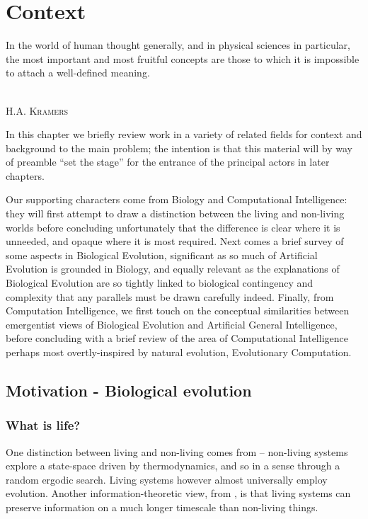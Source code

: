 \chapter{Context}\label{context}

\epigraph{%
In the world of human thought generally, and in physical sciences in particular, the most important and most fruitful concepts are those to which it is impossible to attach a well-defined meaning.}%
{\textsc{\\H.A. Kramers}}

In this chapter we briefly review work in a variety of related fields for context and background to the main problem; the intention is that this material will by way of preamble ``set the stage'' for the entrance of the principal actors in later chapters.

Our supporting characters come from Biology and Computational Intelligence: they will first attempt to draw a distinction between the living and non-living worlds before concluding unfortunately that the difference is clear where it is unneeded, and opaque where it is most required. Next comes a brief survey of some aspects in Biological Evolution, significant as so much of Artificial Evolution is grounded in Biology, and equally relevant as the explanations of Biological Evolution are so tightly linked to biological contingency and complexity that any parallels must be drawn carefully indeed. Finally, from Computation Intelligence, we first touch on the conceptual similarities between emergentist views of Biological Evolution and Artificial General Intelligence, before concluding with a brief review of the area of Computational Intelligence perhaps most overtly-inspired by natural evolution, Evolutionary Computation.

\section{Motivation - Biological evolution}
\subsection{What is life?}\label{what-is-life}

One distinction between living and non-living comes from \autocite{Rasmussen2004} -- non-living systems explore a state-space driven by thermodynamics, and so in a sense through a random ergodic search. Living systems however almost universally employ evolution. Another information-theoretic view, from \autocite{Adami2015}, is that living systems can preserve information on a much longer timescale than non-living things.

